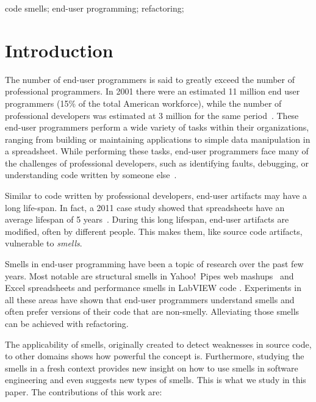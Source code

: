 \documentclass[10pt,conference,compsocconf]{IEEEtran}
\begin{document}
\begin{IEEEkeywords}
code smells;
end-user programming;
refactoring;
\end{IEEEkeywords}

\section{Introduction}
The number of end-user programmers is said to greatly exceed the number of professional programmers. In 2001 there were an estimated 11 million end user programmers (15\% of the total American workforce), while the number of professional developers was estimated at 3 million for the same period~\cite{Scaf2005}. These end-user programmers perform a wide variety of tasks within their organizations, ranging from building or maintaining applications to simple data manipulation in a spreadsheet. While performing these tasks, end-user programmers face many of the challenges of professional developers, such as identifying faults, debugging, or understanding code written by someone else~\cite{Ko2011}.

Similar to code written by professional developers, end-user artifacts may have a long life-span. In fact, a 2011 case study showed that spreadsheets have an average lifespan of 5 years~\cite{Hermans2011}. During this long lifespan, end-user artifacts are modified, often by different people. This makes them, like source code artifacts, vulnerable to \emph{smells}. 

Smells in end-user programming have been a topic of research over the past few years. Most notable are structural smells in Yahoo!\ Pipes web mashups~\cite{Stolee2011} and  Excel spreadsheets \cite{Hermans2012inter} and performance smells in LabVIEW code \cite{chambers2013smell}.
Experiments in all these areas have shown that end-user programmers understand smells and often prefer versions of their code that are non-smelly.
Alleviating those smells can be achieved with refactoring.

The applicability of smells, originally created to detect weaknesses in source code, to other domains shows how powerful the concept is. Furthermore, studying the smells in a fresh context  provides new insight on how to use smells in software engineering and  even suggests new types of smells. This is what we study in this paper.
The contributions of this work are:
\end{document}
